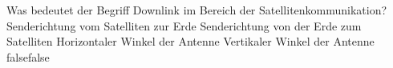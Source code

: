     {Was bedeutet der Begriff Downlink im Bereich der Satellitenkommunikation?}
    {Senderichtung vom Satelliten zur Erde}
    {Senderichtung von der Erde zum Satelliten}
    {Horizontaler Winkel der Antenne}
    {Vertikaler Winkel der Antenne}
    {false}{false}